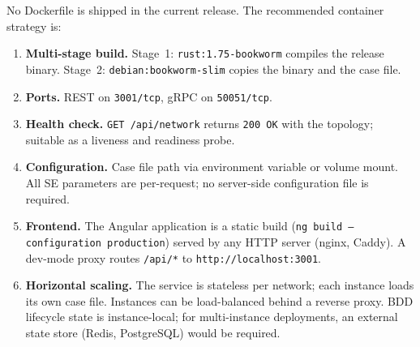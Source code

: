 \documentclass[11pt,a4paper]{article}
\begin{document}
No Dockerfile is shipped in the current release.  The recommended
container strategy is:

\begin{enumerate}
  \item \textbf{Multi-stage build.}  Stage~1: \texttt{rust:1.75-bookworm}
        compiles the release binary.  Stage~2: \texttt{debian:bookworm-slim}
        copies the binary and the case file.
  \item \textbf{Ports.}  REST on \texttt{3001/tcp}, gRPC on
        \texttt{50051/tcp}.
  \item \textbf{Health check.}  \texttt{GET /api/network} returns
        \texttt{200~OK} with the topology; suitable as a liveness and
        readiness probe.
  \item \textbf{Configuration.}  Case file path via environment variable
        or volume mount.  All SE parameters are per-request; no server-side
        configuration file is required.
  \item \textbf{Frontend.}  The Angular application is a static build
        (\texttt{ng build --configuration production}) served by any
        HTTP server (nginx, Caddy).  A dev-mode proxy routes
        \texttt{/api/*} to \texttt{http://localhost:3001}.
  \item \textbf{Horizontal scaling.}  The service is stateless per network;
        each instance loads its own case file.  Instances can be
        load-balanced behind a reverse proxy.  BDD lifecycle state is
        instance-local; for multi-instance deployments, an external state
        store (Redis, PostgreSQL) would be required.
\end{enumerate}

\begin{center}
\end{center}
\end{document}
